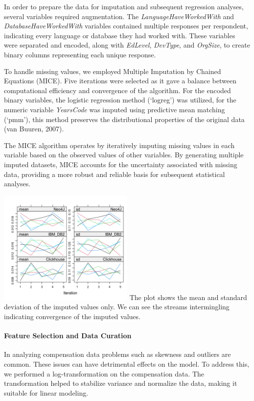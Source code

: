\documentclass[
  12pt,
]{article}
\begin{document}
In order to prepare the data for imputation and subsequent regression
analyses, several variables required augmentation. The
\emph{LanguageHaveWorkedWith} and \emph{DatabaseHaveWorkedWith}
variables contained multiple responses per respondent, indicating every
language or database they had worked with. These variables were
separated and encoded, along with \emph{EdLevel}, \emph{DevType}, and
\emph{OrgSize}, to create binary columns representing each unique
response.

To handle missing values, we employed Multiple Imputation by Chained
Equations (MICE). Five iterations were selected as it gave a balance
between computational efficiency and convergence of the algorithm. For
the encoded binary variables, the logistic regression method (`logreg')
was utilized, for the numeric variable \emph{YearsCode} was imputed
using predictive mean matching (`pmm'), this method preserves the
distributional properties of the original data (van Buuren, 2007).

The MICE algorithm operates by iteratively imputing missing values in
each variable based on the observed values of other variables. By
generating multiple imputed datasets, MICE accounts for the uncertainty
associated with missing data, providing a more robust and reliable basis
for subsequent statistical analyses.

\includegraphics[width=0.5\textwidth,height=0.5\textheight]{wiggle_plots.png}
The plot shows the mean and standard deviation of the imputed values
only. We can see the streams intermingling indicating convergence of the
imputed values.

\hypertarget{feature-selection-and-data-curation}{%
\paragraph{Feature Selection and Data
Curation}\label{feature-selection-and-data-curation}}

In analyzing compensation data problems such as skewness and outliers
are common. These issues can have detrimental effects on the model. To
address this, we performed a log-transformation on the compensation
data. The transformation helped to stabilize variance and normalize the
data, making it suitable for linear modeling.
\end{document}
